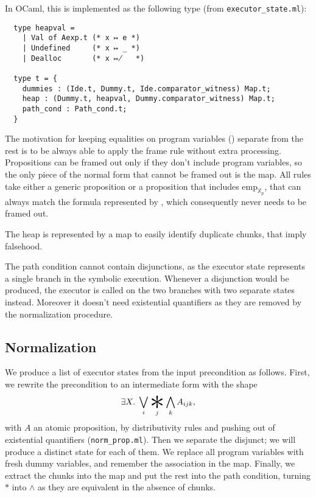 \documentclass[parskip=half]{scrartcl}
\begin{document}
In OCaml, this is implemented as the following type (from \texttt{executor\_state.ml}):
\begin{verbatim}
  type heapval =
    | Val of Aexp.t (* x ↦ e *)
    | Undefined     (* x ↦ _ *)
    | Dealloc       (* x ↦̸   *)

  type t = {
    dummies : (Ide.t, Dummy.t, Ide.comparator_witness) Map.t;
    heap : (Dummy.t, heapval, Dummy.comparator_witness) Map.t;
    path_cond : Path_cond.t;
  }
\end{verbatim}

The motivation for keeping equalities on program variables () separate from the rest is to be always able to apply the frame rule without extra processing. Propositions can be framed out only if they don't include program variables, so the only piece of the normal form that cannot be framed out is the  map. All rules take either a generic proposition or a proposition that includes \(\mathrm{emp}_{\mathbb X_{p}}\), that can always match the formula represented by , which consequently never needs to be framed out.

The heap is represented by a map to easily identify duplicate chunks, that imply falsehood.

The path condition cannot contain disjunctions, as the executor state represents a single branch in the symbolic execution. Whenever a disjunction would be produced, the executor is called on the two branches with two separate states instead. Moreover it doesn't need existential quantifiers as they are removed by the normalization procedure.

\subsection{Normalization}

We produce a list of executor states from the input precondition as follows.
First, we rewrite the precondition to an intermediate form with the shape
\[\exists X.\;\bigvee_{i}\bigast_{j}\bigwedge_{k} A_{ijk},\]
with \(A\) an atomic proposition, by distributivity rules and pushing out of existential quantifiers (\texttt{norm\_prop.ml}). Then we separate the disjunct; we will produce a distinct state for each of them. We replace all program variables with fresh dummy variables, and remember the association in the  map. Finally, we extract the chunks into the  map and put the rest into the path condition, turning \(\ast\) into \(\wedge\) as they are equivalent in the absence of chunks.
\end{document}
